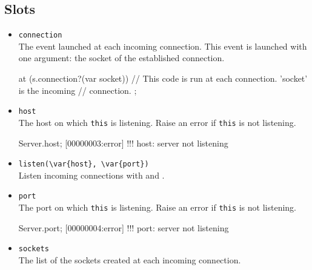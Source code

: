 \subsection{Slots}
\begin{itemize}
\item \lstinline|connection|\\
  The event launched at each incoming connection. This event is
  launched with one argument: the socket of the established connection.
\begin{urbiscript}[firstnumber=last]
at (s.connection?(var socket))
{
  // This code is run at each connection. 'socket' is the incoming
  // connection.
};
\end{urbiscript}

\item \lstinline|host|\\
  The host on which \lstinline|this| is listening. Raise an error if
  \lstinline|this| is not listening.
\begin{urbiscript}[firstnumber=last]
Server.host;
[00000003:error] !!! host: server not listening
\end{urbiscript}

\item \lstinline|listen(\var{host}, \var{port})|\\
  Listen incoming connections with  and .

\item \lstinline|port|\\
  The port on which \lstinline|this| is listening. Raise an error if
  \lstinline|this| is not listening.
\begin{urbiscript}[firstnumber=last]
Server.port;
[00000004:error] !!! port: server not listening
\end{urbiscript}

\item \lstinline|sockets|\\
  The list of the sockets created at each incoming connection.
\end{itemize}

